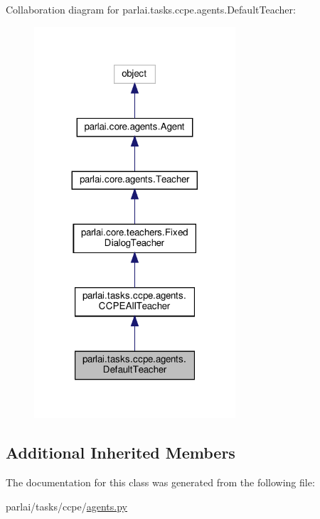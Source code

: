 Collaboration diagram for parlai.\+tasks.\+ccpe.\+agents.\+Default\+Teacher\+:
\nopagebreak
\begin{figure}[H]
\begin{center}
\leavevmode
\includegraphics[width=212pt]{classparlai_1_1tasks_1_1ccpe_1_1agents_1_1DefaultTeacher__coll__graph}
\end{center}
\end{figure}
\subsection*{Additional Inherited Members}


The documentation for this class was generated from the following file\+:\begin{DoxyCompactItemize}
\item 
parlai/tasks/ccpe/\hyperlink{parlai_2tasks_2ccpe_2agents_8py}{agents.\+py}\end{DoxyCompactItemize}
